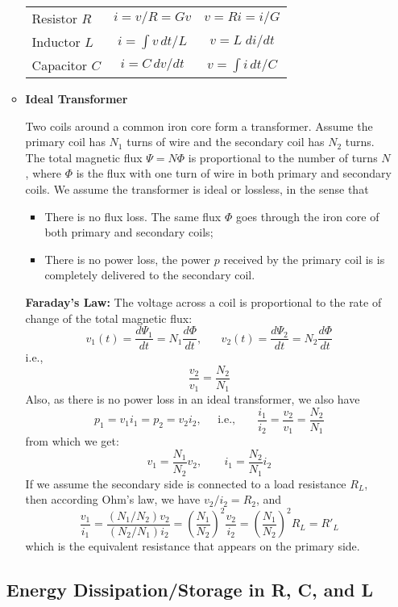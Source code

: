 \begin{itemize}
\begin{itemize}
  \begin{tabular}{l|cc}
    Resistor $R$ & $i=v/R=Gv$ & $v=Ri=i/G$ \\
    Inductor $L$ & $i=\int v\,dt/L$ & $v=L\;di/dt$ \\
    Capacitor $C$ & $i=C\,dv/dt$ & $v=\int i\,dt/C$ \\
  \end{tabular}

\item {\bf Ideal Transformer}


  Two coils around a common iron core form a transformer. Assume the
  primary coil has $N_1$ turns of wire and the secondary coil has $N_2$ 
  turns. The total magnetic flux $\Psi=N\Phi$ is proportional to the 
  number of turns $N$, where $\Phi$ is the flux with one turn of wire
  in both primary and secondary coils. We assume the transformer is 
  ideal or lossless, in the sense that 
  \begin{itemize}
  \item There is no flux loss. The same flux $\Phi$ goes through the 
    iron core of both primary and secondary coils; 
  \item There is no power loss, the power $p$ received by the primary 
    coil is is completely delivered to the secondary coil.
  \end{itemize}

  {\bf Faraday's Law:} The voltage across a coil is proportional to 
  the rate of change of the total magnetic flux: 
  \[ 
  v_1(t)=\frac{d\Psi_1}{dt}=N_1\frac{d\Phi}{dt},\;\;\;\;\;\;
  v_2(t)=\frac{d\Psi_2}{dt}=N_2\frac{d\Phi}{dt} 
  \]
  i.e.,
  \[
  \frac{v_2}{v_1}=\frac{N_2}{N_1}	
  \]
  Also, as there is no power loss in an ideal transformer, we also have
  \[
  p_1=v_1 i_1=p_2=v_2 i_2,\;\;\;\;\;\mbox{i.e.,}\;\;\;\;\;\;\;
  \frac{i_1}{i_2}=\frac{v_2}{v_1}=\frac{N_2}{N_1}
  \]
  from which we get:
  \[
  v_1=\frac{N_1}{N_2} v_2,\;\;\;\;\;\;\;i_1=\frac{N_2}{N_1} i_2 
  \]
  If we assume the secondary side is connected to a load resistance $R_L$,
  then according Ohm's law, we have $v_2/i_2=R_2$, and
  \[
  \frac{v_1}{i_1}=\frac{(N_1/N_2)v_2}{(N_2/N_1)i_2}
  =\left(\frac{N_1}{N_2}\right)^2 \frac{v_2}{i_2}
  =\left(\frac{N_1}{N_2}\right)^2 R_L=R'_L 
  \]
  which is the equivalent resistance that appears on the primary side.

\end{itemize}


\subsection*{Energy Dissipation/Storage in R, C, and L}


\end{itemize}
